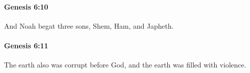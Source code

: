 		\paragraph{Genesis 6:10} %
			\label{GENESIS-6-10}

			And Noah begat three sons, Shem, Ham, and Japheth.


		\paragraph{Genesis 6:11} %
			\label{GENESIS-6-11}

			The earth also was corrupt before God, and the earth was filled with violence.


